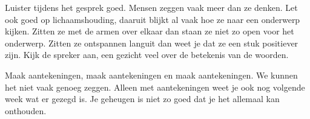 
Luister tijdens het gesprek goed. Mensen zeggen vaak meer dan ze denken. Let ook goed op lichaamshouding, daaruit blijkt al vaak hoe ze naar een onderwerp kijken. Zitten ze met de armen over elkaar dan staan ze niet zo open voor het onderwerp. Zitten ze ontspannen languit dan weet je dat ze een stuk positiever zijn. Kijk de spreker aan, een gezicht veel over de betekenis van de woorden.

Maak aantekeningen, maak aantekeningen en maak aantekeningen. We kunnen het niet vaak genoeg zeggen. Alleen met aantekeningen weet je ook nog volgende week wat er gezegd is. Je geheugen is niet zo goed dat je het allemaal kan onthouden.
